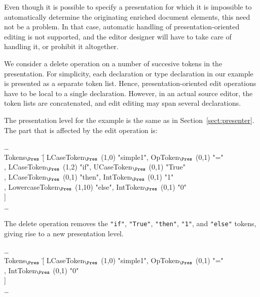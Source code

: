 \bc
Even though it is possible to specify a presentation for which it is impossible to automatically determine the originating enriched document elements, this need not be a problem. In that case, automatic handling of presentation-oriented editing is not supported, and the editor designer will have to take care of handling it, or prohibit it altogether. \ec

We consider a delete operation on a number of succesive tokens in the presentation. For simplicity, each declaration or type declaration in our example is presented as a separate token list. Hence, presentation-oriented edit operations have to be local to a single declaration. However, in an actual source editor, the token lists are concatenated, and edit editing may span several declarations.

The presentation level for the example is the same as in Section~\ref{sect:presenter}. The part that is affected by the edit operation is: 

\small \ttfamily
\begin{tabbing}
\dots\\
Tokens$_{\Pres}$ \= [ LCaseToken$_{\Pres}$ (1,0) "simple1", OpToken$_{\Pres}$ (0,1) "="\\
                         \> , LCaseToken$_{\Pres}$ (1,2) "if", UCaseToken$_{\Pres}$ (0,1) "True"\\
                         \> , LCaseToken$_{\Pres}$ (0,1) "then", IntToken$_{\Pres}$ (0,1) "1"\\
                         \> , LowercaseToken$_{\Pres}$ (1,10) "else", IntToken$_{\Pres}$ (0,1) "0"\\
                         \> ]\\
\dots                                                  
\end{tabbing}
\rmfamily \normalsize

The delete operation removes the \verb|"if"|,  \verb|"True"|,  \verb|"then"|,  \verb|"1"|, and  \verb|"else"| tokens, giving rise to a new presentation level.

\small \ttfamily
\begin{tabbing}
\dots\\
Tokens$_{\Pres}$ \= [ LCaseToken$_{\Pres}$ (1,0) "simple1", OpToken$_{\Pres}$ (0,1) "="\\
                         \> ,  IntToken$_{\Pres}$ (0,1) "0"\\
                         \> ]\\
\dots                                                  
\end{tabbing}
\rmfamily \normalsize

